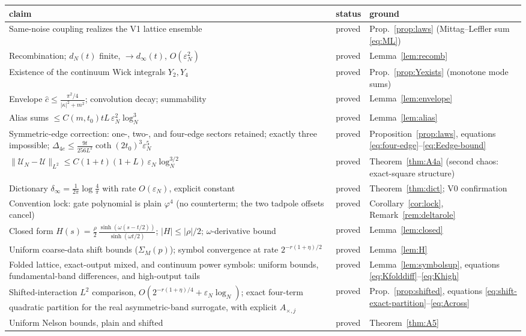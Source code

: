 \documentclass[11pt,a4paper]{article}
\theoremstyle{plain}
\theoremstyle{definition}
\newcommand{\eps}{\varepsilon}
\newcommand{\U}{\mathcal U}
\DeclareMathOperator{\cth}{coth}
\DeclareMathOperator{\sh}{sinh}
\begin{document}
\begin{longtable}{P{5.6cm}P{2.4cm}P{5.8cm}}
\toprule
claim & status & ground \\
\midrule
\endhead
Same-noise coupling realizes the V1 lattice ensemble & proved &
Prop.~\ref{prop:laws} (Mittag--Leffler sum \eqref{eq:ML}) \\
Recombination; $d_N(t)$ finite, $\to d_\infty(t)$, $O(\eps_N^2)$ & proved &
Lemma~\ref{lem:recomb} \\
Existence of the continuum Wick integrals $Y_2,Y_4$ & proved &
Prop.~\ref{prop:Yexists} (monotone mode sums) \\
Envelope $\hat c\le\frac{\pi^2/4}{|\kappa|^2+m^2}$; convolution decay;
summability & proved & Lemma~\ref{lem:envelope} \\
Alias sums $\le C(m,t_0)tL\,\eps_N^2\log_N^3$ & proved &
Lemma~\ref{lem:alias} \\
Symmetric-edge correction: one-, two-, and four-edge sectors retained;
exactly three impossible; $\Delta_{4e}\le
\frac{9t}{256L^2}\cth(2t_0)^3\eps_N^5$ & proved &
Proposition~\ref{prop:laws}, equations \eqref{eq:four-edge}--\eqref{eq:Eedge-bound} \\
$\|\U_N-\U\|_{L^2}\le C(1+t)(1+L)\,\eps_N\log_N^{3/2}$ & proved &
Theorem~\ref{thm:A4a} (second chaos: exact-square structure) \\
Dictionary $\delta_\infty=\frac1{2\pi}\log\frac4\pi$ with rate
$O(\eps_N)$, explicit constant & proved & Theorem~\ref{thm:dict}; V0
confirmation \\
Convention lock: gate polynomial is plain $\varphi^4$ (no counterterm;
the two tadpole offsets cancel) & proved & Corollary~\ref{cor:lock},
Remark~\ref{rem:deltarole} \\
Closed form $H(s)=\frac{\rho}2\,
\frac{\sh(\omega(s-t/2))}{\sh(\omega t/2)}$; $|H|\le|\rho|/2$;
$\omega$-derivative bound & proved & Lemma~\ref{lem:closed} \\
Uniform coarse-data shift bounds ($\Sigma_M(p)$); symbol convergence at
rate $2^{-r(1+\eta)/2}$ & proved & Lemma~\ref{lem:H} \\
Folded lattice, exact-output mixed, and continuum power symbols: uniform
bounds, fundamental-band differences, and high-output tails & proved &
Lemma~\ref{lem:symbolsup}, equations \eqref{eq:Kfolddiff}--\eqref{eq:Khigh} \\
Shifted-interaction $L^2$ comparison,
$O(2^{-r(1+\eta)/4}+\eps_N\log_N)$; exact four-term quadratic partition
for the real asymmetric-band surrogate, with explicit $A_{\times,j}$ & proved & Prop.~\ref{prop:shifted},
equations \eqref{eq:shift-exact-partition}--\eqref{eq:Across} \\
Uniform Nelson bounds, plain and shifted & proved & Theorem~\ref{thm:A5} \\
\bottomrule
\end{longtable}
\end{document}
